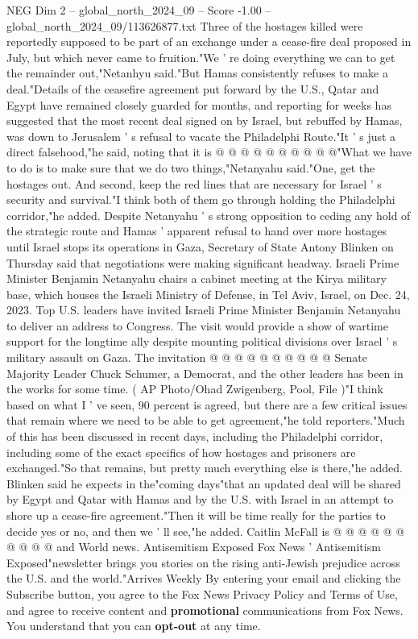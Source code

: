 \begin{textsample}{NEG Dim 2 – global\_north\_2024\_09 – Score -1.00 – global\_north\_2024\_09/113626877.txt}
Three of the hostages killed were reportedly supposed to be part of an exchange under a cease-fire deal proposed in July, but which never came to fruition."We ' re doing everything we can to get the remainder out,"Netanhyu said."But Hamas consistently refuses to make a deal."Details of the ceasefire agreement put forward by the U.S., Qatar and Egypt have remained closely guarded for months, and reporting for weeks has suggested that the most recent deal signed on by Israel, but rebuffed by Hamas, was down to Jerusalem ' s refusal to vacate the Philadelphi Route."It ' s just a direct falsehood,"he said, noting that it is @ @ @ @ @ @ @ @ @ @"What we have to do is to make sure that we do two things,"Netanyahu said."One, get the hostages out.
And second, keep the red lines that are necessary for Israel ' s security and survival."I think both of them go through holding the Philadelphi corridor,"he added.
Despite Netanyahu ' s strong opposition to ceding any hold of the strategic route and Hamas ' apparent refusal to hand over more hostages until Israel stops its operations in Gaza, Secretary of State Antony Blinken on Thursday said that negotiations were making significant headway.
Israeli Prime Minister Benjamin Netanyahu chairs a cabinet meeting at the Kirya military base, which houses the Israeli Ministry of Defense, in Tel Aviv, Israel, on Dec. 24, 2023.
Top U.S. leaders have invited Israeli Prime Minister Benjamin Netanyahu to deliver an address to Congress.
The visit would provide a show of wartime support for the longtime ally despite mounting political divisions over Israel ' s military assault on Gaza.
The invitation @ @ @ @ @ @ @ @ @ @ Senate Majority Leader Chuck Schumer, a Democrat, and the other leaders has been in the works for some time. ( AP Photo/Ohad Zwigenberg, Pool, File )"I think based on what I ' ve seen, 90 percent is agreed, but there are a few critical issues that remain where we need to be able to get agreement,"he told reporters."Much of this has been discussed in recent days, including the Philadelphi corridor, including some of the exact specifics of how hostages and prisoners are exchanged."So that remains, but pretty much everything else is there,"he added.
Blinken said he expects in the"coming days"that an updated deal will be shared by Egypt and Qatar with Hamas and by the U.S. with Israel in an attempt to shore up a cease-fire agreement."Then it will be time really for the parties to decide yes or no, and then we ' ll see,"he added.
Caitlin McFall is @ @ @ @ @ @ @ @ @ @ and World news.
Antisemitism Exposed Fox News ' Antisemitism Exposed"newsletter brings you stories on the rising anti-Jewish prejudice across the U.S. and the world."Arrives Weekly By entering your email and clicking the Subscribe button, you agree to the Fox News Privacy Policy and Terms of Use, and agree to receive content and \textbf{promotional} communications from Fox News.
You understand that you can \textbf{opt-out} at any time.

\end{textsample}
